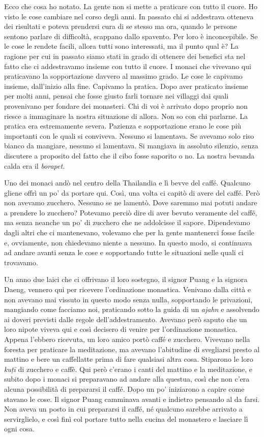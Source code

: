 Ecco che cosa ho notato. La gente non si mette a praticare con tutto il
cuore. Ho visto le cose cambiare nel corso degli anni. In passato chi si
addestrava otteneva dei risultati e poteva prendersi cura di se stesso
ma ora, quando le persone sentono parlare di difficoltà, scappano dallo
spavento. Per loro è inconcepibile. Se le cose le rendete facili, allora
tutti sono interessati, ma il punto qual è? La ragione per cui in
passato siamo stati in grado di ottenere dei benefici sta nel fatto che
ci addestravamo insieme con tutto il cuore. I monaci che vivevano qui
praticavano la sopportazione davvero al massimo grado. Le cose le
capivamo insieme, dall'inizio alla fine. Capivamo la pratica. Dopo aver
praticato insieme per molti anni, pensai che fosse giusto farli tornare
nei villaggi dai quali provenivano per fondare dei monasteri. Chi di voi
è arrivato dopo proprio non riesce a immaginare la nostra situazione di
allora. Non so con chi parlarne. La pratica era estremamente severa.
Pazienza e sopportazione erano le cose più importanti con le quali si
conviveva. Nessuno si lamentava. Se avevamo solo riso bianco da
mangiare, nessuno si lamentava. Si mangiava in assoluto silenzio, senza
discutere a proposito del fatto che il cibo fosse saporito o no. La
nostra bevanda calda era il \emph{borapet}.

Uno dei monaci andò nel centro della Thailandia e lì bevve del caffé.
Qualcuno gliene offrì un po' da portare qui. Così, una volta ci capitò
di avere del caffé. Però non avevamo zucchero. Nessuno se ne lamentò.
Dove saremmo mai potuti andare a prendere lo zucchero? Potevamo perciò
dire di aver bevuto veramente del caffé, ma senza neanche un po' di
zucchero che ne addolcisse il sapore. Dipendevamo dagli altri che ci
mantenevano, volevamo che per la gente mantenerci fosse facile e,
ovviamente, non chiedevamo niente a nessuno. In questo modo, si
continuava ad andare avanti senza le cose e sopportando tutte le
situazioni nelle quali ci trovavamo.

Un anno due laici che ci offrivano il loro sostegno, il signor Puang e
la signora Daeng, vennero qui per ricevere l'ordinazione monastica.
Venivano dalla città e non avevano mai vissuto in questo modo senza
nulla, sopportando le privazioni, mangiando come facciamo noi,
praticando sotto la guida di un \emph{ajahn} e assolvendo ai doveri
previsti dalle regole dell'addestramento. Avevano però saputo che un
loro nipote viveva qui e così decisero di venire per l'ordinazione
monastica. Appena l'ebbero ricevuta, un loro amico portò caffé e
zucchero. Vivevano nella foresta per praticare la meditazione, ma
avevano l'abitudine di svegliarsi presto al mattino e bere un
caffellatte prima di fare qualsiasi altra cosa. Stiparono le loro
\emph{kuṭī} di zucchero e caffè. Qui però c'erano i canti del mattino e
la meditazione, e subito dopo i monaci si preparavano ad andare alla
questua, così che non c'era alcuna possibilità di prepararsi il caffé.
Dopo un po' iniziarono a capire come stavano le cose. Il signor Puang
camminava avanti e indietro pensando al da farsi. Non aveva un posto in
cui prepararsi il caffé, né qualcuno sarebbe arrivato a servirglielo, e
così finì col portare tutto nella cucina del monastero e lasciare lì
ogni cosa.

